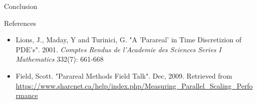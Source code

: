 \documentclass[final]{beamer}
\newlength{\onecolwid}
\begin{document}
\begin{frame}[t]
\begin{columns}[t]
\begin{column}{\onecolwid}
\begin{alertblock}{Conclusion}
\end{alertblock}



\begin{block}{References}

\begin{itemize}
\item Lions, J., Maday, Y and Turinici, G. "A 'Parareal' in Time Discretizion of PDE's". 2001. \textit{Comptes Rendus de l'Academie des Sciences Series I Mathematics} 332(7): 661-668\\

\item Field, Scott. "Parareal Methods Field Talk". Dec, 2009. Retrieved from \url{https://www.sharcnet.ca/help/index.php/Measuring_Parallel_Scaling_Performance}

\end{itemize}


\end{block}


\end{column} %

\end{columns} %

\end{frame} %
\end{document}
